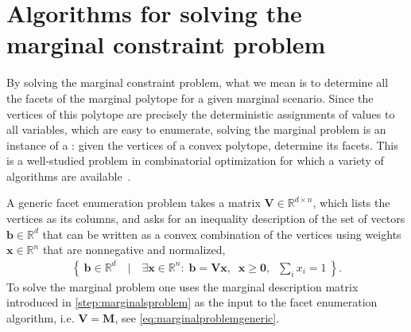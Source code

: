 \documentclass[aps,english,superscriptaddress,onecolumn,twoside,longbibliography,pra,floatfix,fleqn,nofootinbib]{revtex4-1}%
\newcommand*{\tblue}[1]{{\color{MidnightBlue}{\textbf{#1}}}}
\theoremstyle{definition}
\begin{document}
\appendix
{}
\let\stdsection\section
\renewcommand{\section}{\clearpage\stdsection} %






\section{Algorithms for solving the marginal constraint problem}\label{sec:projalgorithms}

By solving the marginal constraint problem, what we mean is to determine all the facets of the marginal polytope for a given marginal scenario. Since the vertices of this polytope are precisely the deterministic assignments of values to all variables, which are easy to enumerate, solving the marginal problem is an instance of a \tblue{facet enumeration problem}: given the vertices of a convex polytope, determine its facets. This is a well-studied problem in combinatorial optimization for which a variety of algorithms are available~\cite{avis_convexhull_2015}. 

A generic facet enumeration problem takes a matrix $\bm{V}\in\mathbb{R}^{d\times n}$, which lists the vertices as its columns, and asks for an inequality description of the set of vectors $\bm{b}\in\mathbb{R}^d$ that can be written as a convex combination of the vertices using weights $\bm{x}\in\mathbb{R}^n$ that are nonnegative and normalized,
\begin{align}
	\label{projsimplex}
	\left\{\: \bm{b}\in\mathbb{R}^d \quad\bigg|\quad \exists \bm{x}\in\mathbb{R}^n:\; \bm{b} = \bm{V}\bm{x} ,\;\; \bm{x}\geq \bm{0},\;\; {{\sum_i}{x_i}}=1 \:\right\}.
\end{align}
To solve the marginal problem one uses the marginal description matrix introduced in \cref{step:marginalsproblem} as the input to the facet enumeration algorithm, i.e. $\bm{V}=\bm{M}$, see \cref{eq:marginalproblemgeneric}.
\end{document}
